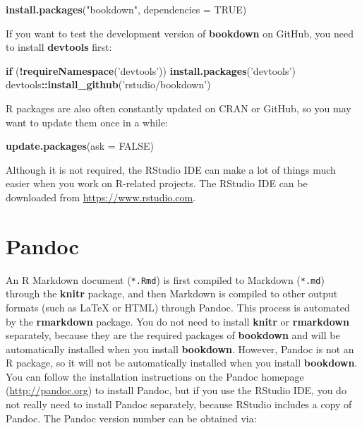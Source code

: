 \documentclass[12pt,]{krantz}
\makeatletter
\newenvironment{Shaded}{\begin{snugshade}}{\end{snugshade}}
\newcommand{\KeywordTok}[1]{\textcolor[rgb]{0.13,0.29,0.53}{\textbf{#1}}}
\newcommand{\DataTypeTok}[1]{\textcolor[rgb]{0.13,0.29,0.53}{#1}}
\newcommand{\StringTok}[1]{\textcolor[rgb]{0.31,0.60,0.02}{#1}}
\newcommand{\OtherTok}[1]{\textcolor[rgb]{0.56,0.35,0.01}{#1}}
\newcommand{\ControlFlowTok}[1]{\textcolor[rgb]{0.13,0.29,0.53}{\textbf{#1}}}
\newcommand{\OperatorTok}[1]{\textcolor[rgb]{0.81,0.36,0.00}{\textbf{#1}}}
\newcommand{\NormalTok}[1]{#1}
\newenvironment{kframe}{%
\medskip{}
\setlength{\fboxsep}{.8em}
 \def\at@end@of@kframe{}%
 \ifinner\ifhmode%
  \def\at@end@of@kframe{\end{minipage}}%
  \begin{minipage}{\columnwidth}%
 \fi\fi%
 \def\FrameCommand##1{\hskip\@totalleftmargin \hskip-\fboxsep
 \colorbox{shadecolor}{##1}\hskip-\fboxsep
     \hskip-\linewidth \hskip-\@totalleftmargin \hskip\columnwidth}%
 \MakeFramed {\advance\hsize-\width
   \@totalleftmargin\z@ \linewidth\hsize
   \@setminipage}}%
 {\par\unskip\endMakeFramed%
 \at@end@of@kframe}
\renewenvironment{Shaded}{\begin{kframe}}{\end{kframe}}
\theoremstyle{definition}
\theoremstyle{definition}
\theoremstyle{definition}
\theoremstyle{remark}
\makeatother
\begin{document}
\begin{Shaded}
\begin{Highlighting}[]
\KeywordTok{install.packages}\NormalTok{(}\StringTok{"bookdown"}\NormalTok{, }\DataTypeTok{dependencies =} \OtherTok{TRUE}\NormalTok{)}
\end{Highlighting}
\end{Shaded}

If you want to test the development version of \textbf{bookdown} on
GitHub, you need to install \textbf{devtools} first:

\begin{Shaded}
\begin{Highlighting}[]
\ControlFlowTok{if}\NormalTok{ (}\OperatorTok{!}\KeywordTok{requireNamespace}\NormalTok{(}\StringTok{'devtools'}\NormalTok{)) }\KeywordTok{install.packages}\NormalTok{(}\StringTok{'devtools'}\NormalTok{)}
\NormalTok{devtools}\OperatorTok{::}\KeywordTok{install_github}\NormalTok{(}\StringTok{'rstudio/bookdown'}\NormalTok{)}
\end{Highlighting}
\end{Shaded}

R packages are also often constantly updated on CRAN or GitHub, so you
may want to update them once in a while:

\begin{Shaded}
\begin{Highlighting}[]
\KeywordTok{update.packages}\NormalTok{(}\DataTypeTok{ask =} \OtherTok{FALSE}\NormalTok{)}
\end{Highlighting}
\end{Shaded}

Although it is not required, the RStudio IDE can make a lot of things
much easier when you work on R-related projects. The RStudio IDE can be
downloaded from \url{https://www.rstudio.com}.

\section{Pandoc}\label{pandoc}

An R Markdown document (\texttt{*.Rmd}) is first compiled to Markdown
(\texttt{*.md}) through the \textbf{knitr} package, and then Markdown is
compiled to other output formats (such as LaTeX or HTML) through
Pandoc. This process is automated by the
\textbf{rmarkdown} package. You do not need to install \textbf{knitr} or
\textbf{rmarkdown} separately, because they are the required packages of
\textbf{bookdown} and will be automatically installed when you install
\textbf{bookdown}. However, Pandoc is not an R package, so it will not
be automatically installed when you install \textbf{bookdown}. You can
follow the installation instructions on the Pandoc homepage
(\url{http://pandoc.org}) to install Pandoc, but if you use the RStudio
IDE, you do not really need to install Pandoc separately, because
RStudio includes a copy of Pandoc. The Pandoc version number can be
obtained via:
\end{document}
